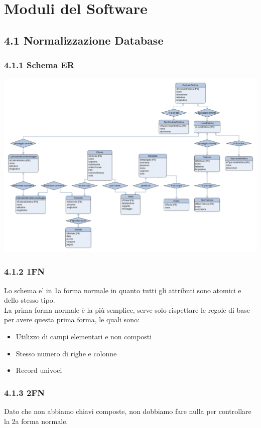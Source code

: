 \chapter{Moduli del Software} %

\section*{4.1 \hspace{1cm} Normalizzazione Database}
\subsection*{4.1.1 \hspace{1cm} Schema ER}
\includegraphics[width=\linewidth]{Figures/ER.png}
\subsection*{4.1.2 \hspace{1cm} 1FN}
Lo schema e' in 1a forma normale in quanto tutti gli attributi sono atomici e dello stesso tipo. \\
La prima forma normale è la più semplice, serve solo rispettare le regole di base per avere questa prima forma, le quali sono:
\begin{itemize}
    \item Utilizzo di campi elementari e non composti
    \item Stesso numero di righe e colonne
    \item Record univoci
\end{itemize}

\subsection*{4.1.3 \hspace{1cm} 2FN}
Dato che non abbiamo chiavi composte, non dobbiamo fare nulla per controllare la 2a forma normale. \\

